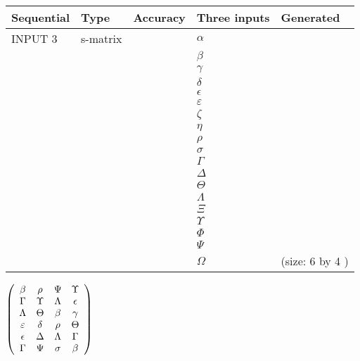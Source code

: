 \documentclass[12pt]{article}
\begin{document}
  
\noindent\begin{tabular}{|l|l|l|l|l|}
\hline
 Sequential & Type & Accuracy & Three inputs & Generated \\ 
\hline
 
 
  INPUT $  3 $ & s-matrix & & 
 $  \alpha $ & 
  \\
  & & & 
 $  \beta $ & 
  \\
  & & & 
 $  \gamma $ & 
  \\
  & & & 
 $  \delta $ & 
  \\
  & & & 
 $  \epsilon $ & 
  \\
  & & & 
 $  \varepsilon $ & 
  \\
  & & & 
 $                     \zeta $ & 
  \\
  & & & 
 $  \eta $ & 
  \\
  & & & 
 $  \rho $ & 
  \\
  & & & 
 $  \sigma $ & 
  \\
  & & & 
 $  \Gamma $ & 
  \\
  & & & 
 $  \Delta $ & 
  \\
  & & & 
 $  \Theta $ & 
  \\
  & & & 
 $  \Lambda $ & 
  \\
  & & & 
 $                     \Xi $ & 
  \\
  & & & 
 $  \Upsilon $ & 
  \\
  & & & 
 $  \Phi $ & 
  \\
  & & & 
 $  \Psi $ & 
  \\
  & & & 
 $  \Omega $ & 
  (size:  6  by  4 )
 \\  \hline  
 \end{tabular}
   
   
 $  \left( \begin{array}
 {
 c
 c
 c
 c
 }
 \beta & 
 \rho & 
 \Psi & 
 \Upsilon \\ 
 \Gamma & 
 \Upsilon & 
 \Lambda & 
 \epsilon \\ 
 \Lambda & 
 \Theta & 
 \beta & 
 \gamma \\ 
 \varepsilon & 
 \delta & 
 \rho & 
 \Theta \\ 
 \epsilon & 
 \Delta & 
 \Lambda & 
 \Gamma \\ 
 \Gamma & 
 \Psi & 
 \sigma & 
 \beta
 \end{array} \right) $ 
  
\end{document}
